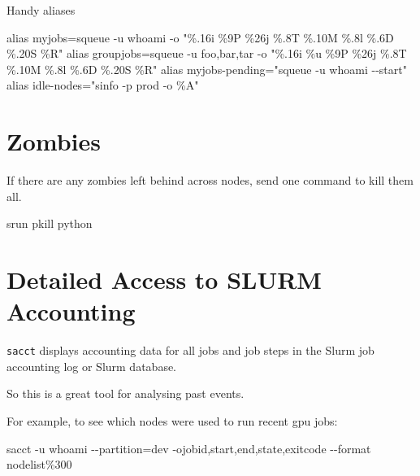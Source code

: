 \documentclass[
]{report}
\newenvironment{Shaded}{\begin{snugshade}}{\end{snugshade}}
\newcommand{\AttributeTok}[1]{\textcolor[rgb]{0.40,0.45,0.13}{#1}}
\newcommand{\BuiltInTok}[1]{\textcolor[rgb]{0.00,0.23,0.31}{#1}}
\newcommand{\ExtensionTok}[1]{\textcolor[rgb]{0.00,0.23,0.31}{#1}}
\newcommand{\FunctionTok}[1]{\textcolor[rgb]{0.28,0.35,0.67}{#1}}
\newcommand{\KeywordTok}[1]{\textcolor[rgb]{0.00,0.23,0.31}{#1}}
\newcommand{\NormalTok}[1]{\textcolor[rgb]{0.00,0.23,0.31}{#1}}
\newcommand{\OperatorTok}[1]{\textcolor[rgb]{0.37,0.37,0.37}{#1}}
\newcommand{\StringTok}[1]{\textcolor[rgb]{0.13,0.47,0.30}{#1}}
\begin{document}
Handy aliases

\begin{Shaded}
\begin{Highlighting}[]
\BuiltInTok{alias}\NormalTok{ myjobs=}\StringTok{\textquotesingle{}squeue {-}u \textasciigrave{}whoami\textasciigrave{} {-}o "\%.16i \%9P \%26j \%.8T \%.10M \%.8l \%.6D \%.20S \%R"\textquotesingle{}}
\BuiltInTok{alias}\NormalTok{ groupjobs=}\StringTok{\textquotesingle{}squeue {-}u foo,bar,tar {-}o "\%.16i \%u \%9P \%26j \%.8T \%.10M \%.8l \%.6D \%.20S \%R"\textquotesingle{}}
\BuiltInTok{alias}\NormalTok{ myjobs{-}pending=}\StringTok{"squeue {-}u }\KeywordTok{\textasciigrave{}}\FunctionTok{whoami}\KeywordTok{\textasciigrave{}}\StringTok{ {-}{-}start"}
\BuiltInTok{alias}\NormalTok{ idle{-}nodes=}\StringTok{"sinfo {-}p prod {-}o \textquotesingle{}\%A\textquotesingle{}"}
\end{Highlighting}
\end{Shaded}

\section{Zombies}\label{zombies}

If there are any zombies left behind across nodes, send one command to
kill them all.

\begin{Shaded}
\begin{Highlighting}[]
\ExtensionTok{srun}\NormalTok{ pkill python}
\end{Highlighting}
\end{Shaded}

\section{Detailed Access to SLURM
Accounting}\label{detailed-access-to-slurm-accounting}

\texttt{sacct} displays accounting data for all jobs and job steps in
the Slurm job accounting log or Slurm database.

So this is a great tool for analysing past events.

For example, to see which nodes were used to run recent gpu jobs:

\begin{Shaded}
\begin{Highlighting}[]
\ExtensionTok{sacct} \AttributeTok{{-}u} \KeywordTok{\textasciigrave{}}\FunctionTok{whoami}\KeywordTok{\textasciigrave{}} \AttributeTok{{-}{-}partition}\OperatorTok{=}\NormalTok{dev }\AttributeTok{{-}ojobid,start,end,state,exitcode} \AttributeTok{{-}{-}format}\NormalTok{ nodelist\%300}
\end{Highlighting}
\end{Shaded}
\end{document}
